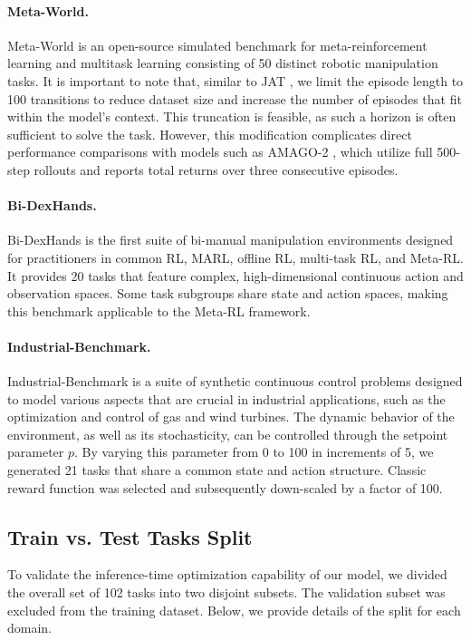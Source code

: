 \documentclass{article}
\theoremstyle{plain}
\theoremstyle{definition}
\theoremstyle{remark}
\begin{document}
\paragraph{Meta-World.} Meta-World \cite{yu2021metaworldbenchmarkevaluationmultitask} is an open-source simulated benchmark for meta-reinforcement learning and multitask learning consisting of 50 distinct robotic manipulation tasks. It is important to note that, similar to JAT \cite{gallouédec2024jacktradesmastersome}, we limit the episode length to 100 transitions to reduce dataset size and increase the number of episodes that fit within the model's context. This truncation is feasible, as such a horizon is often sufficient to solve the task. However, this modification complicates direct performance comparisons with models such as AMAGO-2 \cite{grigsby2024amago2breakingmultitaskbarrier}, which utilize full 500-step rollouts and reports total returns over three consecutive episodes.

\paragraph{Bi-DexHands.} Bi-DexHands \cite{chen2022humanlevelbimanualdexterousmanipulation} is the first suite of bi-manual manipulation environments designed for practitioners in common RL, MARL, offline RL, multi-task RL, and Meta-RL. It provides 20 tasks that feature complex, high-dimensional continuous action and observation spaces. Some task subgroups share state and action spaces, making this benchmark applicable to the Meta-RL framework.

\paragraph{Industrial-Benchmark.} Industrial-Benchmark \cite{Hein_2017} is a suite of synthetic continuous control problems designed to model various aspects that are crucial in industrial applications, such as the optimization and control of gas and wind turbines. The dynamic behavior of the environment, as well as its stochasticity, can be controlled through the setpoint parameter $p$. By varying this parameter from 0 to 100 in increments of 5, we generated 21 tasks that share a common state and action structure. Classic reward function was selected and subsequently down-scaled by a factor of 100.

\subsection{Train vs. Test Tasks Split}\label{appendix:dataset:train-test-split}
To validate the inference-time optimization capability of our model, we divided the overall set of 102 tasks into two disjoint subsets. The validation subset was excluded from the training dataset. Below, we provide details of the split for each domain.
\end{document}
